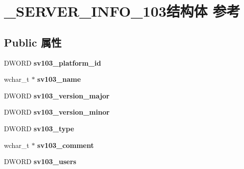 \hypertarget{struct___s_e_r_v_e_r___i_n_f_o__103}{}\section{\+\_\+\+S\+E\+R\+V\+E\+R\+\_\+\+I\+N\+F\+O\+\_\+103结构体 参考}
\label{struct___s_e_r_v_e_r___i_n_f_o__103}
\subsection*{Public 属性}
\begin{DoxyCompactItemize}
\item 
\mbox{\label{struct___s_e_r_v_e_r___i_n_f_o__103_a6bfb4935c35a58587e23610b7c0fd4eb}} 
D\+W\+O\+RD {\bfseries sv103\+\_\+platform\+\_\+id}
\item 
\mbox{\label{struct___s_e_r_v_e_r___i_n_f_o__103_abddd4f91b91493e15b672b6874555de9}} 
wchar\+\_\+t $\ast$ {\bfseries sv103\+\_\+name}
\item 
\mbox{\label{struct___s_e_r_v_e_r___i_n_f_o__103_a0c36fccbf14b857d09193ff0c96c93ce}} 
D\+W\+O\+RD {\bfseries sv103\+\_\+version\+\_\+major}
\item 
\mbox{\label{struct___s_e_r_v_e_r___i_n_f_o__103_a6c25372818ec493a221db5b0ed364fef}} 
D\+W\+O\+RD {\bfseries sv103\+\_\+version\+\_\+minor}
\item 
\mbox{\label{struct___s_e_r_v_e_r___i_n_f_o__103_a5ab3314c699589d364b4a674d60530b7}} 
D\+W\+O\+RD {\bfseries sv103\+\_\+type}
\item 
\mbox{\label{struct___s_e_r_v_e_r___i_n_f_o__103_a1697c549485005cedfd910cef044d77e}} 
wchar\+\_\+t $\ast$ {\bfseries sv103\+\_\+comment}
\item 
\mbox{\label{struct___s_e_r_v_e_r___i_n_f_o__103_a0ac58a52d03864748374253ff66f3674}} 
D\+W\+O\+RD {\bfseries sv103\+\_\+users}
\item 
\mbox{\label{struct___s_e_r_v_e_r___i_n_f_o__103_a8d3770c5ef4dcf6b27a212ad8a89d2cd}} 

\end{DoxyCompactItemize}

